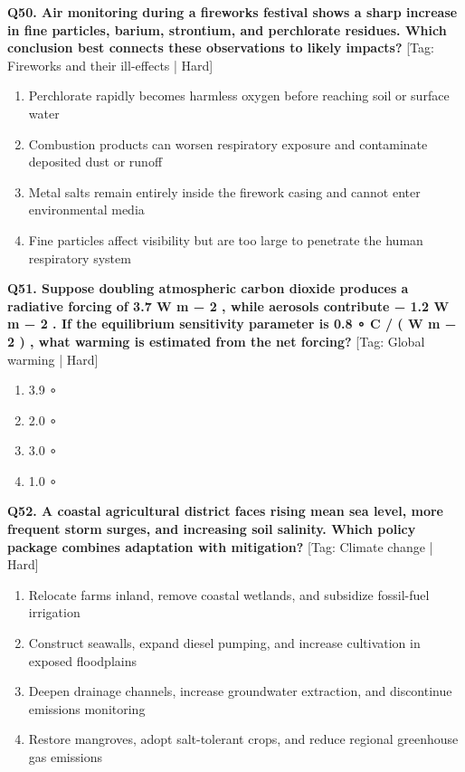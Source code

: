 \noindent\textbf{Q50. Air monitoring during a fireworks festival shows a sharp increase in fine particles, barium, strontium, and perchlorate residues. Which conclusion best connects these observations to likely impacts?} \hfill [Tag: Fireworks and their ill-effects | Hard]
\begin{enumerate}[label=(\alph*),topsep=2pt,itemsep=1pt,partopsep=0pt,parsep=0pt]
    \item {Perchlorate rapidly becomes harmless oxygen before reaching soil or surface water}
    \item {Combustion products can worsen respiratory exposure and contaminate deposited dust or runoff}
    \item {Metal salts remain entirely inside the firework casing and cannot enter environmental media}
    \item {Fine particles affect visibility but are too large to penetrate the human respiratory system}
\end{enumerate}
\vspace{2mm}

\noindent\textbf{Q51. Suppose doubling atmospheric carbon dioxide produces a radiative forcing of 3.7 W m − 2 , while aerosols contribute − 1.2 W m − 2 . If the equilibrium sensitivity parameter is 0.8 ∘ C / ( W m − 2 ) , what warming is estimated from the net forcing?} \hfill [Tag: Global warming | Hard]
\begin{enumerate}[label=(\alph*),topsep=2pt,itemsep=1pt,partopsep=0pt,parsep=0pt]
    \item {3.9 ∘}
    \item {2.0 ∘}
    \item {3.0 ∘}
    \item {1.0 ∘}
\end{enumerate}
\vspace{2mm}

\noindent\textbf{Q52. A coastal agricultural district faces rising mean sea level, more frequent storm surges, and increasing soil salinity. Which policy package combines adaptation with mitigation?} \hfill [Tag: Climate change | Hard]
\begin{enumerate}[label=(\alph*),topsep=2pt,itemsep=1pt,partopsep=0pt,parsep=0pt]
    \item {Relocate farms inland, remove coastal wetlands, and subsidize fossil-fuel irrigation}
    \item {Construct seawalls, expand diesel pumping, and increase cultivation in exposed floodplains}
    \item {Deepen drainage channels, increase groundwater extraction, and discontinue emissions monitoring}
    \item {Restore mangroves, adopt salt-tolerant crops, and reduce regional greenhouse gas emissions}
\end{enumerate}
\vspace{2mm}

